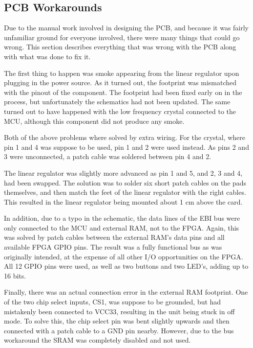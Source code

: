 
\subsection{PCB Workarounds}

Due to the manual work involved in designing the PCB, and because it was fairly
unfamiliar ground for everyone involved, there were many things that could go
wrong. This section describes everything that was wrong with the PCB along with
what was done to fix it.

The first thing to happen was smoke appearing from the linear regulator upon
plugging in the power source. As it turned out, the footprint was mismatched
with the pinout of the component. The footprint had been fixed early on in the
process, but unfortunately the schematics had not been updated. The same turned
out to have happened with the low frequency crystal connected to the MCU,
although this component did not produce any smoke.

Both of the above problems where solved by extra wiring. For the crystal, where
pin 1 and 4 was suppose to be used, pin 1 and 2 were used instead. As pins 2 and
3 were unconnected, a patch cable was soldered between pin 4 and 2.




The linear regulator was slightly more advanced as pin 1 and 5, and 2, 3 and 4,
had been swapped. The solution was to solder six short patch cables on the pads
themselves, and then match the feet of the linear regulator with the right
cables. This resulted in the linear regulator being mounted about 1 cm above the
card.




In addition, due to a typo in the schematic, the data lines of the EBI bus were
only connected to the MCU and external RAM, not to the FPGA. Again, this was
solved by patch cables between the external RAM's data pins and all available
FPGA GPIO pins. The result was a fully functional bus as was originally
intended, at the expense of all other I/O opportunities on the FPGA. All 12 GPIO
pins were used, as well as two buttons and two LED's, adding up to 16 bits.




Finally, there was an actual connection error in the external RAM footprint.
One of the two chip select inputs, CS1, was suppose to be grounded, but had
mistakenly been connected to VCC33, resulting in the unit being stuck in off
mode. To solve this, the chip select pin was bent slightly upwards and then
connected with a patch cable to a GND pin nearby. However, due to the bus
workaround the SRAM was completely disabled and not used.

